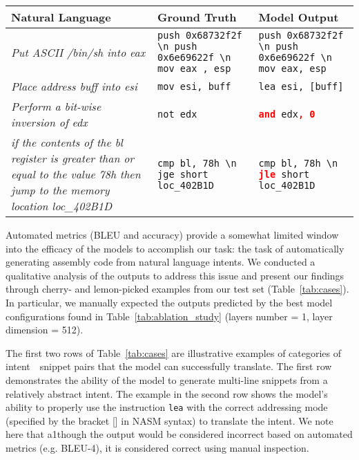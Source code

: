 \documentclass[11pt,a4paper]{article}
\begin{document}
\begin{table*}[ht!]
\footnotesize
\centering
\begin{tabular}{
 >{\centering\arraybackslash}m{6.5cm}|
 >{\centering\arraybackslash}m{4cm}|
 >{\centering\arraybackslash}m{4cm}}

\toprule
\textbf{Natural Language} & \textbf{Ground Truth} & \textbf{Model Output}\\
\midrule
\textit{Put ASCII /bin/sh into eax} & \texttt{push 0x68732f2f \textbackslash n push 0x6e69622f \textbackslash n mov eax , esp} & \texttt{push 0x68732f2f \textbackslash n push 0x6e69622f \textbackslash n mov eax, esp} \\
\midrule
\textit{Place address buff into esi} & \texttt{mov esi, buff} & \texttt{lea esi, [buff]}\\
\midrule
\textit{Perform a bit-wise inversion of edx} &    \texttt{not edx} & \texttt{\textcolor{red}{\textbf{and}} edx\textcolor{red}{\textbf{, 0}}}\\
\midrule
\textit{if the contents of the bl register is greater than or equal to the value 78h then jump to the memory location loc\_402B1D} &	\texttt{cmp bl, 78h  \textbackslash n jge short loc\_402B1D} & \texttt{cmp bl, 78h  \textbackslash n \textcolor{red}{\textbf{jle}} short loc\_402B1D} \\
\bottomrule
\end{tabular}
\caption{Illustrative examples of correct and incorrect output. The prediction errors are \textcolor{red}{\textbf{red/bold}}.}
\label{tab:cases}
\end{table*}


Automated metrics (BLEU and accuracy) provide a somewhat limited window into the efficacy of the models to accomplish our task: the task of automatically generating assembly code from natural language intents. We conducted a qualitative analysis of the outputs to address this issue and present our findings through cherry- and lemon-picked examples from our test set (Table~\ref{tab:cases}). In particular, we manually expected the outputs predicted by the best model configurations found in Table~\ref{tab:ablation_study} (layers number = 1, layer dimension = 512).



The first two rows of Table~\ref{tab:cases} are illustrative examples of categories of  intent~\textendash~snippet pairs that the model can successfully translate. 
The first row demonstrates the ability of the model to generate multi-line snippets from a relatively abstract intent. 
The example in the second row shows the model's ability to properly use the instruction \texttt{lea} with the correct addressing mode (specified by the bracket [] in NASM syntax) to translate the intent. We note here that a1though the output would be considered incorrect based on automated metrics (e.g.  BLEU-4), it is considered correct using manual inspection.
\end{document}
